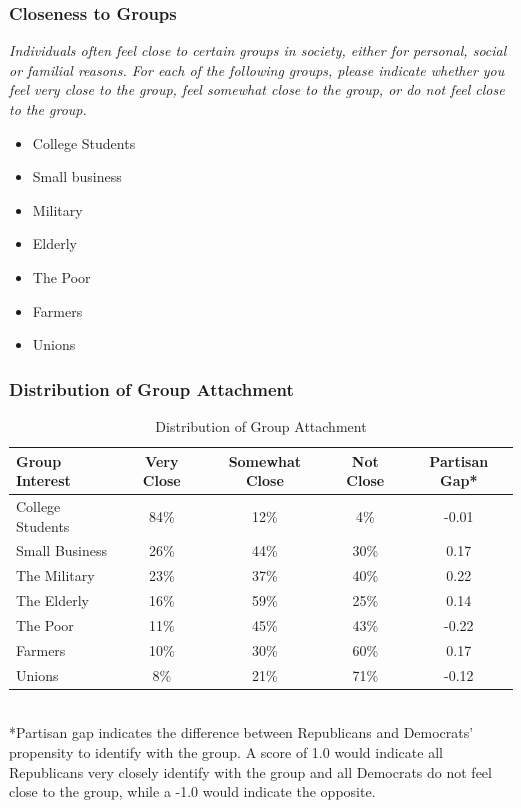 \documentclass[14pt]{beamer}
\newcommand\e{\emph}
\newcommand\tb{\textbf}
\begin{document}
\begin{frame}
\frametitle{Closeness to Groups}
\small
\begin{center}
	\e{Individuals often feel close to certain groups in society, either for personal, social or familial reasons. For each of the following groups, please indicate whether you feel very close to the group, feel somewhat close to the group, or do not feel close to the group.}
\end{center}
\begin{itemize} \itemsep -2pt
	\item College Students
	\item Small business
	\item Military
	\item Elderly
	\item The Poor
	\item Farmers
	\item Unions
\end{itemize}
\end{frame}

\begin{frame}
\frametitle{Distribution of Group Attachment}
\scriptsize
\begin{table}
	\centering
	\caption{Distribution of Group Attachment}
	\begin{tabulary}{\linewidth}{lc c c c}
		\\
		\hline 
		\tb{Group Interest}&\tb{Very Close}&\tb{Somewhat Close}&\tb{Not Close}&\tb{Partisan Gap*}\\
		\hline
		College Students&84\%&12\%&4\%&-0.01\\
		Small Business&26\%&44\%&30\%&0.17\\
		The Military& 23\%&37\%&40\%&0.22\\
		The Elderly&16\%&59\%&25\%&0.14\\
		The Poor&11\%&45\%&43\%&-0.22\\
		Farmers&10\%&30\%&60\%&0.17\\
		Unions&8\%&21\%&71\%&-0.12\\
		\hline
	\end{tabulary}\\
	*Partisan gap indicates the difference between Republicans and Democrats’ propensity to identify with the group. A score of 1.0 would indicate all Republicans very closely identify with the group and all Democrats do not feel close to the group, while a -1.0 would indicate the opposite.
\end{table}
\end{frame}
\end{document}
